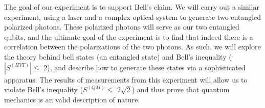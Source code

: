 \documentclass{article}
\begin{document}
    The goal of our experiment is to support Bell's claim. We will carry out a similar experiment, using a laser and a complex optical system to generate two entangled polarized photons. These polarized photons will serve as our two entangled qubits, and the ultimate goal of the experiment is to find that indeed there is a correlation between the polarizations of the two photons. As such, we will explore the theory behind bell states (an entangled state) and Bell's inequality ($|S^{(HVT)}| \leq$ 2), and describe how to generate these states via a sophisticated apparatus. The results of measurements from this experiment will allow us to violate Bell's inequality ($S^{(QM)} \leq$ 2$\sqrt{2}$) and thus prove that quantum mechanics is an valid description of nature.
    
\end{document}
